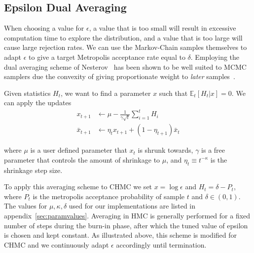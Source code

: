 \documentclass[11pt]{article}
\begin{document}
    \subsection{Epsilon Dual Averaging}
    When choosing a value for $\epsilon$, a value that is too small will result in excessive computation time to explore
    the distribution, and a value that is too large will cause large rejection rates.
    We can use the Markov-Chain samples themselves to adapt $\epsilon$ to give a target Metropolis acceptance rate equal to $\delta$.
    Employing the dual averaging scheme of Nesterov~\cite{nesterov_dual_averaging} has been shown to be well suited
    to MCMC samplers due the convexity of giving proportionate weight to \emph{later} samples~\cite{hoffman2011nouturn}.

    Given statistics $H_t$, we want to find a parameter $x$ such that $\mathbb{E}_t[H_t|x] = 0$.
    We can apply the updates
    \begin{equation}\label{eq:dual_averaging}
    \begin{aligned}
        x_{t+1} &\gets \mu - \frac{1}{\gamma \sqrt{t}} \sum_{i=1}^t H_i \\
        \bar{x}_{t+1} &\gets \eta_t x_{t+1} + (1 - \eta_{t+1}) \bar{x}_t
    \end{aligned}
    \end{equation}

    where $\mu$ is a user defined parameter that $x_t$ is shrunk towards, $\gamma$ is a free parameter that controls
    the amount of shrinkage to $\mu$, and $\eta_t \equiv t^{-\kappa}$ is the shrinkage step size.

    To apply this averaging scheme to CHMC we set $x = \log{\epsilon}$ and $H_t = \delta - P_t$, where $P_t$ is the
    metropolis acceptance probability of sample $t$ and $\delta \in (0, 1)$.
    The values for $\mu, \kappa, \delta$ used for our implementations are listed in appendix~\ref{sec:paramvalues}.
    Averaging in HMC is generally performed for a fixed number of steps during the burn-in phase, after which the
    tuned value of epsilon is chosen and kept constant.
    As illustrated above, this scheme is modified for CHMC and we continuously adapt $\epsilon$ accordingly until termination.
\end{document}
